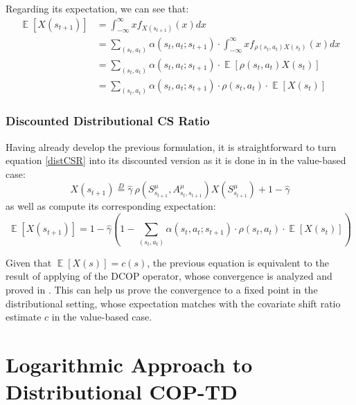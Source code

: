 \documentclass[12pt,a4paper,openright,twoside]{article}
\DeclareMathOperator*{\E}{\mathbb{E}}
\numberwithin{equation}{section}
\theoremstyle{definition}
\theoremstyle{remark}
\theoremstyle{plain}
\begin{document}
Regarding its expectation, we can see that:
\begin{equation}
\begin{split}
    \E[X (s_{t+1})] &= \int_{-\infty}^{\infty} x f_{X(s_{t+1})}(x) dx \\
    &= \sum_{(s_{t},a_{t})} \alpha(s_{t},a_{t};s_{t+1}) \cdot \int_{-\infty}^{\infty} x f_{\rho(s_{t},a_{t}) X(s_{t})}(x) dx \\
    &= \sum_{(s_{t},a_{t})} \alpha(s_{t},a_{t};s_{t+1}) \cdot \E \left[ \rho(s_{t},a_{t}) X(s_{t}) \right] \\
    &=  \sum_{(s_{t},a_{t})} \alpha(s_{t},a_{t};s_{t+1}) \cdot \rho(s_{t},a_{t}) \cdot \E \left[X(s_{t}) \right] 
\end{split}
\end{equation}

\subsubsection*{Discounted Distributional CS Ratio}
Having already develop the previous formulation, it is straightforward to turn equation \ref{distCSR} into its discounted version as it is done in \cite{DCOPTD} in the value-based case:
\begin{equation} \label{distDCSR}
    X(s_{t+1}) \stackrel{D}{=} \hat{\gamma} \ \rho(S^{\mu}_{s_{t+1}},A^{\mu}_{s_{t},s_{t+1}}) X(S^{\mu}_{s_{t+1}}) + 1 -\hat{\gamma}
\end{equation}
as well as compute its corresponding expectation:
\begin{equation}
\E[X (s_{t+1})] = 1- \hat{\gamma}\left(1 - \sum_{(s_{t},a_{t})} \alpha(s_{t},a_{t};s_{t+1}) \cdot \rho(s_{t},a_{t}) \cdot \E \left[X(s_{t}) \right]  \right)
\end{equation}

Given that $\E \left[X(s) \right] = c(s)$, the previous equation is equivalent to the result of applying of the DCOP operator, whose convergence is analyzed and proved in \cite{DCOPTD}. This can help us prove the convergence to a fixed point in the distributional setting, whose expectation matches with the covariate shift ratio estimate $c$ in the value-based case.


\newpage

\thispagestyle{plain}
\section{Logarithmic Approach to Distributional COP-TD}
\end{document}
